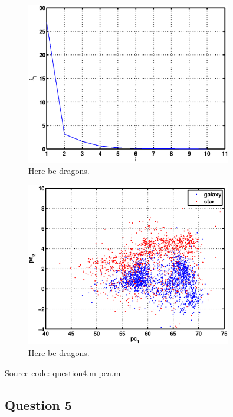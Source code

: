 \documentclass[a4paper, 11pt]{article}
\begin{document}
\begin{figure}[H]
    \centering
    \includegraphics[width=0.8\textwidth]{figures/question4_1}
    \caption{Here be dragons.}\label{fig:question4_1}
\end{figure}

\begin{figure}[H]
    \centering
    \includegraphics[width=0.8\textwidth]{figures/question4_2}
    \caption{Here be dragons.}\label{fig:question4_2}
\end{figure}

Source code: question4.m pca.m

\subsection*{Question 5}
\end{document}
